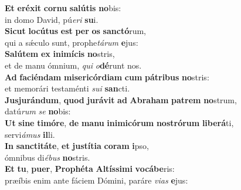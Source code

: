 \evenverse \textbf{Et} \textbf{e}\textbf{ré}\textbf{xit} \textbf{cor}\textbf{nu} \textbf{sa}\textbf{lú}\textbf{tis} \textbf{no}bis:~\*\\
\evenverse in domo David, pú\textit{e}\textit{ri} \textbf{su}i.\\
\oddverse \textbf{Si}\textbf{cut} \textbf{lo}\textbf{cú}\textbf{tus} \textbf{est} \textbf{per} \textbf{os} \textbf{san}\textbf{ctó}rum,~\*\\
\oddverse qui a sǽculo sunt, prophe\textit{tá}\textit{rum} \textbf{e}jus:\\
\evenverse \textbf{Sa}\textbf{lú}\textbf{tem} \textbf{ex} \textbf{i}\textbf{ni}\textbf{mí}\textbf{cis} \textbf{no}stris,~\*\\
\evenverse et de manu ómnium, \textit{qui} \textit{o}\textbf{dé}runt nos.\\
\oddverse \textbf{Ad} \textbf{fa}\textbf{ci}\textbf{én}\textbf{dam} \textbf{mi}\textbf{se}\textbf{ri}\textbf{cór}\textbf{di}\textbf{am} \textbf{cum} \textbf{pá}\textbf{tri}\textbf{bus} \textbf{no}stris:~\*\\
\oddverse et memorári testaménti \textit{su}\textit{i} \textbf{san}cti.\\
\evenverse \textbf{Jus}\textbf{ju}\textbf{rán}\textbf{dum}, \textbf{quod} \textbf{ju}\textbf{rá}\textbf{vit} \textbf{ad} \textbf{A}\textbf{bra}\textbf{ham} \textbf{pa}\textbf{trem} \textbf{no}strum,~\*\\
\evenverse datú\textit{rum} \textit{se} \textbf{no}bis:\\
\oddverse \textbf{Ut} \textbf{si}\textbf{ne} \textbf{ti}\textbf{mó}\textbf{re}, \textbf{de} \textbf{ma}\textbf{nu} \textbf{i}\textbf{ni}\textbf{mi}\textbf{có}\textbf{rum} \textbf{no}\textbf{stró}\textbf{rum} \textbf{li}\textbf{be}\textbf{rá}ti,~\*\\
\oddverse servi\textit{á}\textit{mus} \textbf{il}li.\\
\evenverse \textbf{In} \textbf{san}\textbf{cti}\textbf{tá}\textbf{te}, \textbf{et} \textbf{ju}\textbf{stí}\textbf{ti}\textbf{a} \textbf{co}\textbf{ram} \textbf{i}pso,~\*\\
\evenverse ómnibus di\textit{é}\textit{bus} \textbf{no}stris.\\
\oddverse \textbf{Et} \textbf{tu}, \textbf{pu}\textbf{er}, \textbf{Pro}\textbf{phé}\textbf{ta} \textbf{Al}\textbf{tís}\textbf{si}\textbf{mi} \textbf{vo}\textbf{cá}\textbf{be}ris:~\*\\
\oddverse præíbis enim ante fáciem Dómini, paráre \textit{vi}\textit{as} \textbf{e}jus:\\
